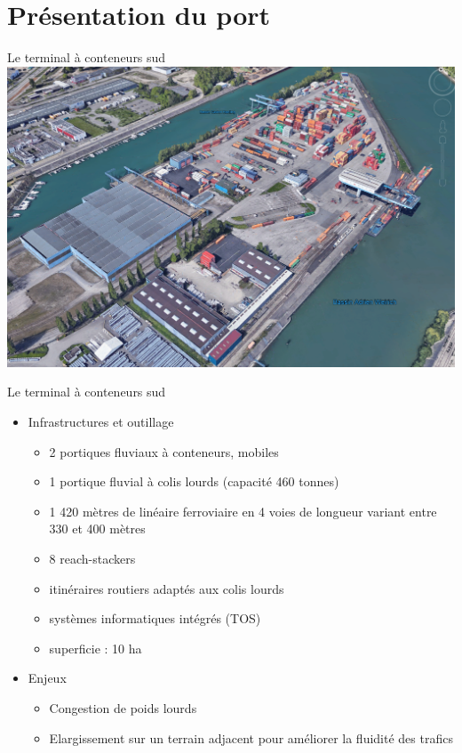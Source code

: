 \section{Présentation du port}

\begin{frame}{Le terminal à conteneurs sud}
  \includegraphics[width=\textwidth]{../images/image14}
\end{frame}

\begin{frame}{Le terminal à conteneurs sud}
  \begin{itemize}
  \item Infrastructures et outillage
    \begin{itemize}
    \item
      2 portiques fluviaux à conteneurs, mobiles
    \item
      1 portique fluvial à colis lourds (capacité 460 tonnes)
    \item
      1 420 mètres de linéaire ferroviaire en 4 voies de longueur variant entre 330 et 400 mètres
    \item
      8 reach-stackers
    \item
      itinéraires routiers adaptés aux colis lourds
    \item
      systèmes informatiques intégrés (TOS)
    \item
      superficie : 10 ha
    \end{itemize}
  \item Enjeux
    \begin{itemize}
    \item Congestion de poids lourds
    \item Elargissement sur un terrain adjacent pour améliorer la fluidité des trafics
    \end{itemize}
  \end{itemize}
\end{frame}

